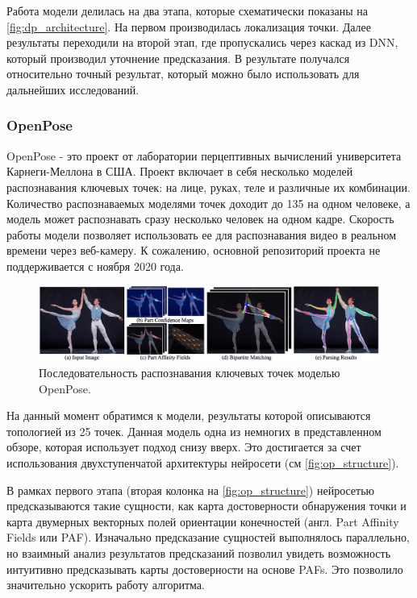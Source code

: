 Работа модели делилась на два этапа, которые схематически показаны на \autoref{fig:dp_architecture}. На первом производилась локализация точки. Далее результаты переходили на второй этап, где пропускались через каскад из DNN, который производил уточнение предсказания. В результате получался относительно точный результат, который можно было использовать для дальнейших исследований.


\subsubsection*{OpenPose}

OpenPose - это проект от лаборатории перцептивных вычислений университета Карнеги-Меллона в США. Проект включает в себя несколько моделей распознавания ключевых точек: на лице, руках, теле и различные их комбинации. Количество распознаваемых моделями точек доходит до 135 на одном человеке, а модель может распознавать сразу несколько человек на одном кадре. Скорость работы модели позволяет использовать ее для распознавания видео в реальном времени через веб-камеру. К сожалению, основной репозиторий проекта не поддерживается с ноября 2020 года.

\begin{figure}[h]
	\centering
	\includegraphics[width=\textwidth]{./images/review/openpose_structure}
	\caption{Последовательность распознавания ключевых точек моделью OpenPose. \cite{OpenPose}}
	\label{fig:op_structure}
\end{figure}

На данный момент обратимся к модели, результаты которой описываются топологией из 25 точек. Данная модель одна из немногих в представленном обзоре, которая использует подход снизу вверх. Это достигается за счет использования двухступенчатой архитектуры нейросети (см \autoref{fig:op_structure}).

В рамках первого этапа (вторая колонка на \autoref{fig:op_structure}) нейросетью предсказываются такие сущности, как карта достоверности обнаружения точки и карта двумерных векторных полей ориентации конечностей (англ. Part Affinity Fields или PAF). Изначально предсказание сущностей выполнялось параллельно, но взаимный анализ результатов предсказаний позволил увидеть возможность интуитивно предсказывать карты достоверности на основе PAFs. Это позволило значительно ускорить работу алгоритма.

